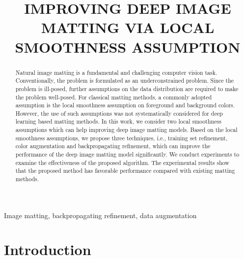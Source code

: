 \documentclass{article}
\theoremstyle{plain}
\begin{document}
\sloppy






\title{IMPROVING DEEP IMAGE MATTING VIA LOCAL SMOOTHNESS ASSUMPTION}
\address{
Center for Applied Statistics and School of Statistics,
\\
Renmin University of China,
Beijing 100872, China
\\
PCIE Lab, Lenovo Research, Beijing, China
\\
School of Optics and Photonics, Beijing Institute of Technology, Beijing, China
\\
Department of Physics, and Fujian Provincial Key Laboratory for Soft Functional Materials Research,
\\
Xiamen University,
Xiamen 361005, China
}


\maketitle


\begin{abstract}
    Natural image matting is a fundamental and challenging computer vision task. Conventionally, the problem is formulated as an underconstrained problem. Since the problem is ill-posed, further assumptions on the data distribution are required to make the problem well-posed. For classical matting methods, a commonly adopted assumption is the local smoothness assumption on foreground and background colors. However, the use of such assumptions was not systematically considered for deep learning based matting methods. In this work, we consider two local smoothness assumptions which can help improving deep image matting models. Based on the local smoothness assumptions, we propose three techniques, i.e., training set refinement, color augmentation and backpropagating refinement, which can improve the performance of the deep image matting model significantly. We conduct experiments to examine the effectiveness of the proposed algorithm. The experimental results show that the proposed  method has favorable performance compared with existing matting methods.
\end{abstract}
\begin{keywords}
    Image matting, backpropagating refinement, data augmentation
\end{keywords}


\section{Introduction}
\end{document}
